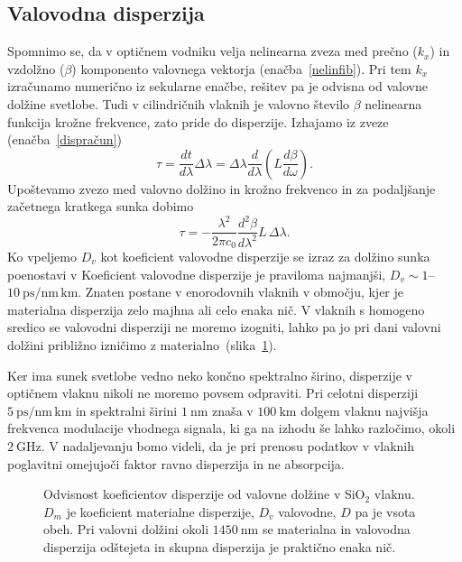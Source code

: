 \subsection*{Valovodna disperzija}
Spomnimo se, da v optičnem vodniku velja nelinearna zveza med prečno ($k_x$) in vzdolžno ($\beta$) komponento  
valovnega vektorja (enačba~\ref{nelinfib}). Pri tem $k_x$ izračunamo numerično iz sekularne enačbe,
rešitev pa je odvisna od valovne dolžine svetlobe. Tudi v cilindričnih vlaknih je valovno število $\beta$
nelinearna funkcija krožne frekvence, zato pride do disperzije. Izhajamo iz zveze (enačba~\ref{dispračun})
\begin{equation}
\tau= \frac{dt}{d\lambda}\Delta \lambda = \Delta \lambda \frac{d}{d\lambda}\left(L \frac{d\beta}{d\omega}\right).
\end{equation}
Upoštevamo zvezo med valovno dolžino in krožno frekvenco in za podaljšanje začetnega kratkega sunka dobimo
\begin{equation}
\tau=-\frac{\lambda^2}{2 \pi c_0}\frac{d^2\beta}{d\lambda^2}L\, \Delta \lambda.
\end{equation}
Ko vpeljemo $D_v$ kot koeficient valovodne disperzije
se izraz za dolžino sunka poenostavi v
Koeficient valovodne disperzije je praviloma najmanjši, 
$D_v \sim 1$--$10~\si{\pico\second/\nano\meter\,\kilo\meter}$. 
Znaten postane v enorodovnih vlaknih v območju, kjer je materialna disperzija 
zelo majhna ali celo enaka nič. 
V vlaknih s homogeno sredico se valovodni disperziji ne moremo
izogniti, lahko pa jo pri dani valovni dolžini približno izničimo z materialno~(slika~\ref{fig:MatVal}). 

Ker ima sunek svetlobe vedno neko končno spektralno širino, disperzije 
v optičnem vlaknu nikoli ne moremo povsem odpraviti. Pri celotni disperziji 
$5~\si{\pico\second/\nano\meter\,\kilo\meter}$ in spektralni širini 
$1~\si{\nano\meter}$ znaša v $100~\si{\kilo\meter}$ dolgem vlaknu najvišja 
frekvenca modulacije vhodnega signala, ki ga na izhodu še lahko razločimo, 
okoli $2~\si{\giga\hertz}$. V nadaljevanju bomo videli, da je pri prenosu podatkov
v vlaknih poglavitni omejujoči faktor ravno disperzija in ne absorpcija. 

\begin{figure}[h]
\centering
\def\svgwidth{90truemm} 
 
\caption{Odvisnost koeficientov disperzije od valovne dolžine v SiO$_2$ vlaknu. $D_m$ 
je koeficient materialne disperzije, $D_v$ valovodne, $D$ pa je vsota obeh. Pri valovni dolžini
okoli $1450~\si{\nano\meter}$ se materialna in valovodna disperzija odštejeta in skupna disperzija
je praktično enaka nič.}
\label{fig:MatVal}
\end{figure}

